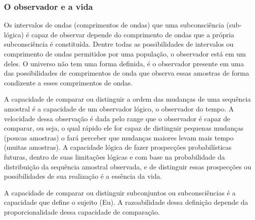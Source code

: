 \subsubsection{O observador e a vida}
Os intervalos de ondas (comprimentos de ondas) que uma subconsciência (sub-lógica) é capaz de observar depende do comprimento de ondas que a própria subconsciência é constituída. Dentre todas as possibilidades de intervalos ou comprimento de ondas permitidos por uma população, o observador está em um deles. O universo não tem uma forma definida, é o observador presente em uma das possibilidades de comprimentos de onda que observa essas amostras de forma condizente a esses comprimentos de ondas. 

A capacidade de comparar ou distinguir a ordem das mudanças de uma sequência amostral é a capacidade de um observador lógico, o observador do tempo. A velocidade dessa observação é dada pelo range que o observador é capaz de comparar, ou seja, o qual rápido ele for capaz de distinguir pequenas mudanças (poucas amostras) o fará perceber que mudanças maiores levam mais tempo (muitas amostras). A capacidade lógica de fazer prospecções probabilísticas futuras, dentro de suas limitações lógicas e com base na probabilidade da distribuição da sequência amostral observada, e de distinguir essas prospecções ou possibilidades de sua realização é a essência da vida. 

A capacidade de comparar ou distinguir subconjuntos ou subconsciências é a capacidade que define o sujeito (Eu). A razoabilidade dessa definição depende da proporcionalidade dessa capacidade de comparação.

